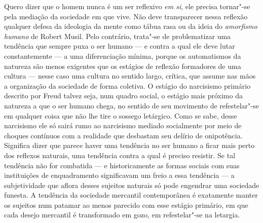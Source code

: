 Quero dizer que o homem nunca é um ser reflexivo \emph{em si}, ele
precisa tornar"-se pela mediação da sociedade em que vive. Não deve
transparecer nessa reflexão qualquer defesa da ideologia da mente como
tábua rasa ou da ideia do \emph{amorfismo humano} de Robert Musil. Pelo
contrário, trata"-se de problematizar uma tendência que sempre puxa o ser
humano --- e contra a qual ele deve lutar constantemente --- a uma
diferenciação mínima, porque os automatismos da natureza são menos
exigentes que os estágios de reflexão formadores de uma cultura --- nesse
caso uma cultura no sentido largo, crítica, que assume nas mãos a
organização da sociedade de forma coletiva. O estágio do
narcisismo primário descrito por Freud talvez seja, num quadro social, o
estágio mais próximo da natureza a que o ser humano chega, no sentido de
seu movimento de refestelar"-se em qualquer coisa que não lhe tire o
sossego letárgico. Como se sabe, desse narcisismo ele só sairá rumo ao
narcisismo mediado socialmente por meio de choques contínuos com a
realidade que desbastam seu delírio de onipotência. Significa dizer que
parece haver uma tendência no ser humano a ficar mais perto dos reflexos
naturais, uma tendência contra a qual é preciso resistir. Se tal
tendência não for combatida --- e historicamente as formas sociais com
suas instituições de enquadramento significavam um freio a essa
tendência --- a subjetividade que aflora desses sujeitos naturais só pode
engendrar uma sociedade funesta. A tendência da sociedade mercantil
contemporânea é exatamente manter os sujeitos num patamar ao menos
parecido com esse estágio primário, em que cada desejo mercantil é
transformado em gozo, em refestelar"-se na letargia.

